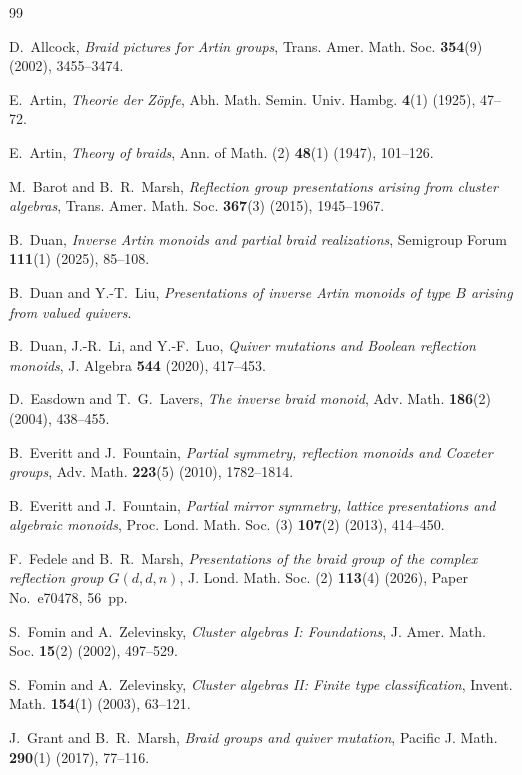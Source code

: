 \documentclass[a4paper, 12pt, reqno]{amsart}
\theoremstyle{definition}
\begin{document}
\begin{thebibliography}{99}

D.~Allcock, \emph{Braid pictures for Artin groups},
Trans. Amer. Math. Soc. \textbf{354}(9) (2002), 3455--3474.

E.~Artin, \emph{Theorie der Z\"opfe},
Abh. Math. Semin. Univ. Hambg. \textbf{4}(1) (1925), 47--72.

E.~Artin, \emph{Theory of braids},
Ann. of Math. (2) \textbf{48}(1) (1947), 101--126.

M.~Barot and B.~R.~Marsh,
\emph{Reflection group presentations arising from cluster algebras},
Trans. Amer. Math. Soc. \textbf{367}(3) (2015), 1945--1967.

B.~Duan, \emph{Inverse Artin monoids and partial braid realizations},
Semigroup Forum \textbf{111}(1) (2025), 85--108.

B.~Duan and Y.-T.~Liu,
\emph{Presentations of inverse Artin monoids of type $B$
arising from valued quivers}.

B.~Duan, J.-R.~Li, and Y.-F.~Luo,
\emph{Quiver mutations and Boolean reflection monoids},
J. Algebra \textbf{544} (2020), 417--453.

D.~Easdown and T.~G.~Lavers, \emph{The inverse braid monoid},
Adv. Math. \textbf{186}(2) (2004), 438--455.

B.~Everitt and J.~Fountain,
\emph{Partial symmetry, reflection monoids and Coxeter groups},
Adv. Math. \textbf{223}(5) (2010), 1782--1814.

B.~Everitt and J.~Fountain,
\emph{Partial mirror symmetry, lattice presentations and algebraic monoids},
Proc. Lond. Math. Soc. (3) \textbf{107}(2) (2013), 414--450.

F.~Fedele and B.~R.~Marsh,
\emph{Presentations of the braid group of the complex reflection
group $G(d,d,n)$},
J. Lond. Math. Soc. (2) \textbf{113}(4) (2026),
Paper No.~e70478, 56~pp.

S.~Fomin and A.~Zelevinsky,
\emph{Cluster algebras I: Foundations},
J. Amer. Math. Soc. \textbf{15}(2) (2002), 497--529.

S.~Fomin and A.~Zelevinsky,
\emph{Cluster algebras II: Finite type classification},
Invent. Math. \textbf{154}(1) (2003), 63--121.

J.~Grant and B.~R.~Marsh, \emph{Braid groups and quiver mutation},
Pacific J. Math. \textbf{290}(1) (2017), 77--116.


\end{thebibliography}
\end{document}
